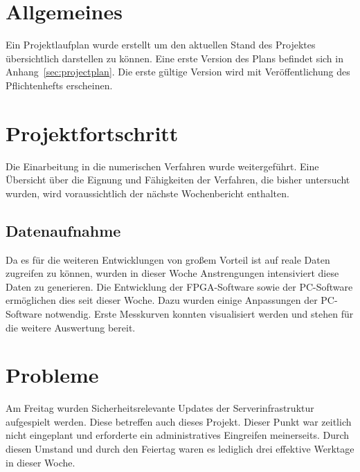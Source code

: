 \documentclass[a4paper,12pt,fleqn]{article}
\begin{document}
\setlength{\headheight}{36pt}

\begin{titlepage}



\end{titlepage}

\section[Allgemeines]{Allgemeines}
Ein Projektlaufplan wurde erstellt um den aktuellen Stand des Projektes übersichtlich darstellen zu können. Eine erste Version des Plans befindet sich in Anhang~\ref{sec:projectplan}. Die erste gültige Version wird mit Veröffentlichung des Pflichtenhefts erscheinen.

\section[Fortschritt]{Projektfortschritt}
Die Einarbeitung in die numerischen Verfahren wurde weitergeführt. Eine Übersicht über die Eignung und Fähigkeiten der Verfahren, die bisher untersucht wurden, wird voraussichtlich der nächste Wochenbericht enthalten.

\subsection{Datenaufnahme}
Da es für die weiteren Entwicklungen von großem Vorteil ist auf reale Daten zugreifen zu können, wurden in dieser Woche Anstrengungen intensiviert diese Daten zu generieren. Die Entwicklung der FPGA-Software sowie der PC-Software ermöglichen dies seit dieser Woche. Dazu wurden einige Anpassungen der PC-Software notwendig. Erste Messkurven konnten visualisiert werden und stehen für die weitere Auswertung bereit.

\section[Probleme]{Probleme}
Am Freitag wurden Sicherheitsrelevante Updates der Serverinfrastruktur aufgespielt werden. Diese betreffen auch dieses Projekt. Dieser Punkt war zeitlich nicht eingeplant und erforderte ein administratives Eingreifen meinerseits. Durch diesen Umstand und durch den Feiertag waren es lediglich drei effektive Werktage in dieser Woche.



\newpage


\end{document}
